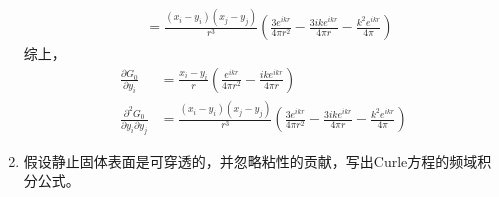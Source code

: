\begin{enumerate}
\begin{equation}
\begin{aligned}
                &= \frac{(x_{i}-y_{i})(x_{j}-y_{j})}{r^3} \left(\frac{3 e^{ikr}}{4 \pi r^2} - \frac{3 i k e^{ikr}}{4 \pi  r} - \frac{k^{2} e^{ikr}}{4 \pi }\right)
            \end{aligned}
        \end{equation}
        综上，
        \begin{align}
            \frac{ \partial G_{0} }{ \partial y_{i} } 
            &= \frac{x_{i} - y_{i}}{r} \left(\frac{e^{ikr}}{4 \pi r^{2}}-\frac{i k e^{ikr}}{4 \pi r}\right) \\
            \frac{ \partial^{2} G_{0} }{ \partial y_{i} \partial y_{j} }
            &= \frac{(x_{i}-y_{i})(x_{j}-y_{j})}{r^3} \left(\frac{3 e^{ikr}}{4 \pi r^2} - \frac{3 i k e^{ikr}}{4 \pi r} - \frac{k^{2} e^{ikr}}{4 \pi }\right)
        \end{align}
    
    \clearpage

    \item 假设静止固体表面是可穿透的，并忽略粘性的贡献，写出Curle方程的频域积分公式。


\end{enumerate}

